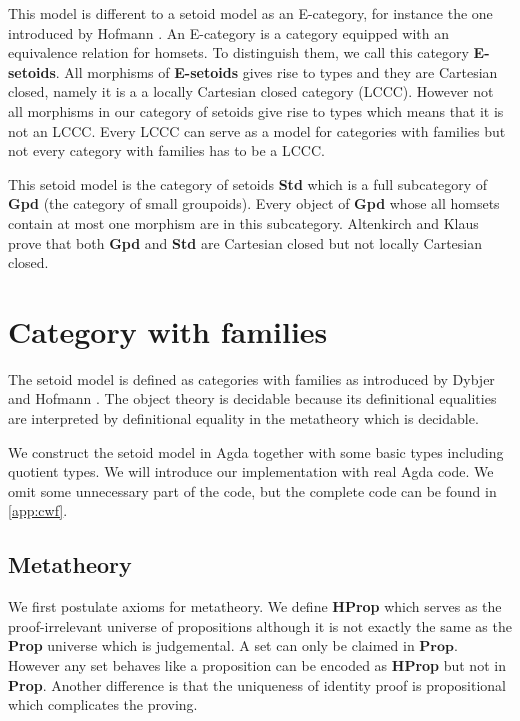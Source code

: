 \begin{remark}
This model is different to a setoid model as an E-category, for instance
the one introduced by Hofmann \cite{hofmann1995interpretation}. An E-category is a category equipped with
an equivalence relation for homsets. To distinguish them, we call this
category \textbf{E-setoids}.  All morphisms of \textbf{E-setoids}
gives rise to types and they are Cartesian closed, namely it is a a locally
Cartesian closed category (LCCC). However not all morphisms in our category of setoids give rise to types which means that it is not an LCCC. Every LCCC can serve as a model for categories with
families but not every category with families has to be a LCCC. 

This setoid model is the category of setoids \textbf{Std} which is a full subcategory of \textbf{Gpd} (the category of small groupoids). Every object of \textbf{Gpd} whose all homsets contain at most one morphism are in this subcategory. Altenkirch and Klaus \cite{Altenkirch12setoidsare} prove that both \textbf{Gpd} and \textbf{Std} are Cartesian closed but not locally Cartesian closed.
\end{remark}


\section{Category with families}


The setoid model is defined as categories with families as introduced by Dybjer \cite{Dyb:96} and Hofmann
\cite{hof:97}. The object theory is decidable because its definitional equalities are interpreted by definitional equality in the metatheory which is decidable.

We construct the setoid model in Agda together with some basic types including quotient types. We will introduce our implementation with real Agda code. We omit some unnecessary part of the code, but the complete code can be found in \autoref{app:cwf}.


\subsection{Metatheory}

We first postulate axioms for metatheory. We define \textbf{HProp} which serves as the proof-irrelevant universe of propositions although it is not exactly the same as the \textbf{Prop} universe which is judgemental. A set can only be claimed in $\textbf{Prop}$. However any set behaves like a proposition can be encoded as \textbf{HProp} but not in \textbf{Prop}. Another difference is that the uniqueness of identity proof is propositional which complicates the proving.

